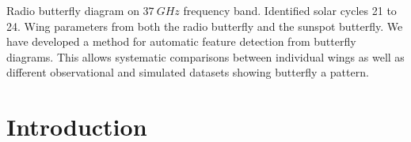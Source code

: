 \documentclass{aa}
\begin{document}
  {
    Radio butterfly diagram on $\SI{37}{GHz}$ frequency band.
    Identified solar cycles 21 to 24.
    Wing parameters from both the radio butterfly and the sunspot butterfly.
  }
  {
    We have developed a method for automatic feature detection from butterfly
    diagrams.
    This allows systematic comparisons between individual wings as well as
    different observational and simulated datasets showing butterfly a pattern.
  }


  \maketitle
    


\section{Introduction}
\end{document}
